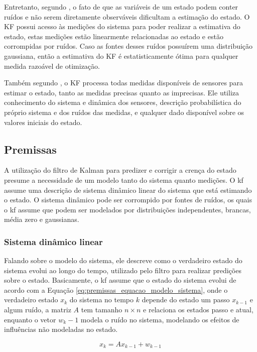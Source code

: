 \documentclass[acronym, symbols]{fei}
\begin{document}
			Entretanto, segundo \textcite{phdthesisNegenborn}, o fato de que as variáveis de um estado podem conter ruídos e não serem diretamente observáveis dificultam a estimação do estado. O KF possui acesso às medições do sistema para poder realizar a estimativa do estado, estas medições estão linearmente relacionadas ao estado e estão corrompidas por ruídos. Caso as fontes desses ruídos possuírem uma distribuição gaussiana, então a estimativa do KF é estatisticamente ótima para qualquer medida razoável de otimização.
			
			Também segundo \textcite{phdthesisNegenborn}, o KF processa todas medidas disponíveis de sensores para estimar o estado, tanto as medidas precisas quanto as imprecisas. Ele utiliza conhecimento do sistema e dinâmica dos sensores, descrição probabilística do próprio sistema e dos ruídos das medidas, e qualquer dado disponível sobre os valores iniciais do estado.
			
		\subsection{Premissas}
		
			A utilização do filtro de Kalman para predizer e corrigir a crença do estado presume a necessidade de um modelo tanto do sistema quanto medições. O \acrshort{kf} assume uma descrição de sistema dinâmico linear do sistema que está estimando o estado. O sistema dinâmico pode ser corrompido por fontes de ruídos, os quais o \acrshort{kf} assume que podem ser modelados por distribuições independentes, brancas, média zero e gaussianas.
			
			\subsubsection{Sistema dinâmico linear}
			
				Falando sobre o modelo do sistema, ele descreve como o verdadeiro estado do sistema evolui ao longo do tempo, utilizado pelo filtro para realizar predições sobre o estado. Basicamente, o \acrshort{kf} assume que o estado do sistema evolui de acordo com a Equação \eqref{eq:premissas_equacao_modelo_sistema}, onde o verdadeiro estado $x_k$ do sistema no tempo $k$ depende do estado um passo $x_{k-1}$ e algum ruído, a matriz $A$ tem tamanho $n \times n$ e relaciona os estados passo e atual, enquanto o vetor $w_k-1$ modela o ruído no sistema, modelando os efeitos de influências não modeladas no estado.
				
				\begin{equation}\label{eq:premissas_equacao_modelo_sistema}
					x_k = Ax_{k-1} + w_{k-1}
				\end{equation}
			
\end{document}
